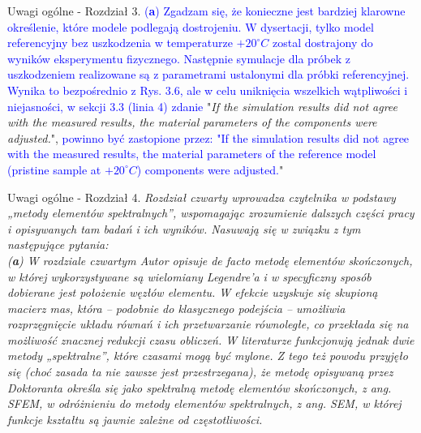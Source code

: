\documentclass[10pt,aspectratio=169]{beamer} %
\begin{document}
\begin{frame}[label=frame6]{Uwagi ogólne - Rozdział 3.}\justifying
\textcolor{blue}{(\textbf{a}) Zgadzam się, że konieczne jest bardziej klarowne określenie, które modele podlegają dostrojeniu. W dysertacji, tylko model referencyjny bez uszkodzenia w temperaturze \(+20^{\circ}C\) zostal dostrajony do wyników eksperymentu fizycznego. Następnie symulacje dla próbek z uszkodzeniem realizowane są z parametrami ustalonymi dla próbki referencyjnej. Wynika to bezpośrednio z Rys. 3.6, ale w celu uniknięcia wszelkich wątpliwości i niejasności, w sekcji 3.3 (linia 4) zdanie} "\textit{If the simulation results did not agree with the measured results, the material parameters of the components were adjusted.}", \textcolor{blue}{powinno być zastopione przez: "If the simulation results did not agree with the measured results, the material parameters of the reference model (pristine sample at \(+20^{\circ}C\)) components were adjusted.}"
\end{frame}
\begin{frame}[label=frame7]{Uwagi ogólne - Rozdział 4.}\justifying
\textit{Rozdział czwarty wprowadza czytelnika w podstawy „metody elementów spektralnych”, wspomagając zrozumienie dalszych części pracy i opisywanych tam badań i ich wyników. Nasuwają się w związku z tym następujące pytania:\\
(\textbf{a}) W rozdziale czwartym Autor opisuje de facto metodę elementów skończonych, w której 	wykorzystywane są wielomiany Legendre’a i w specyficzny sposób dobierane jest położenie węzłów elementu. W efekcie uzyskuje się skupioną macierz mas, która – podobnie do klasycznego podejścia – umożliwia rozprzęgnięcie układu równań i ich przetwarzanie równoległe, co przekłada się na możliwość znacznej redukcji czasu obliczeń. W literaturze funkcjonują jednak dwie metody „spektralne”, które czasami mogą być mylone. Z tego też powodu przyjęło się (choć zasada ta nie zawsze jest przestrzegana), że metodę opisywaną przez Doktoranta określa się jako spektralną metodę elementów skończonych, z ang. SFEM, w odróżnieniu do metody elementów spektralnych, z ang. SEM, w której funkcje kształtu są jawnie zależne od częstotliwości.}
\end{frame}
\end{document}
